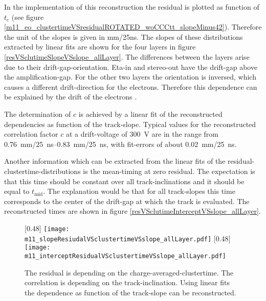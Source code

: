 \documentclass[
twoside,            %
BCOR1.4cm,          %
10pt,               %
headings=normal,    %
headsepline,        %
clearplainpage,		%
final,              %
div=14,
open=right,
bibliography=toc
]{scrreprt}
\begin{document}
In the implementation of this reconstruction the residual is plotted as function of $t_{\mathrm{c}}$ (see figure \ref{m11_eo_clustertimeVSresidualROTATED_woCCCtt_slopeMinus42}).
Therefore the unit of the slopes is given in \si{mm/25ns}.
The slopes of these distributions extracted by linear fits are shown for the four layers in figure \ref{resVSclutimeSlopeVSslope_allLayer}.
The differences between the layers arise due to their drift-gap-orientation.
Eta-in and stereo-out have the drift-gap above the amplification-gap.
For the other two layers the orientation is inversed, which causes a different drift-direction for the electrons.
Therefore this dependence can be explained by the drift of the electrons \cite{flierlThesis}.

The determination of $c$ is achieved by a linear fit of the reconstructed dependencies as function of the track-slope.
Typical values for the reconstructed correlation factor $c$ at a drift-voltage of \SI{300}{V} are in the range from \SIrange{0.76}{0.83}{mm/25 ns}, with fit-errors of about \SI{0.02}{mm/25 ns}.

Another information which can be extracted from the linear fits of the residual-clustertime-distributions is the mean-timing at zero residual.
The expectation is that this time should be constant over all track-inclinations and it should be equal to $t_{\mathrm{mid}}$.
The explanation would be that for all track-slopes this time corresponds to the center of the drift-gap at which the track is evaluated.
The reconstructed times are shown in figure \ref{resVSclutimeInterceptVSslope_allLayer}.

\begin{figure}[!h]
	\centering
	[0.48\textwidth]
	{\texttt{[image: m11\_slopeResiudalVSclustertimeVSslope\_allLayer.pdf]}}
	\hfill
	[0.48\textwidth]
	{\texttt{[image: m11\_interceptResidualVSclustertimeVSslope\_allLayer.pdf]}}
	\vspace{-2mm}
	\caption{
		The residual is depending on the charge-averaged-clustertime.
		The correlation is depending on the track-inclination.
		Using linear fits the dependence as function of the track-slope can be reconstructed.
	}
\end{figure}
\end{document}
